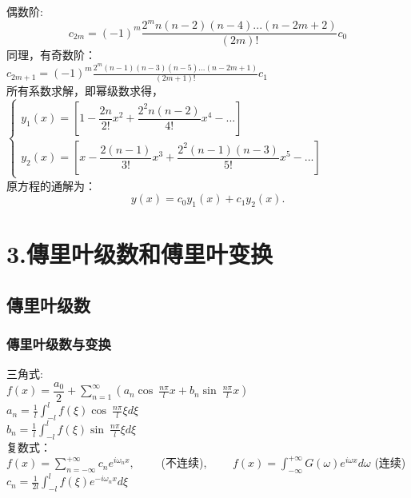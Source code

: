 \begin{frame}	
	偶数阶:
	\[c_{2m} = (-1) ^m \frac{2^mn(n-2)(n-4) ... (n-2m+2)  } {(2m)!} c_0\]
	同理，有奇数阶：\\
	{ $\displaystyle
		c_{2m+1} = (-1) ^m \frac{2^m (n-1) (n-3)(n-5)...(n-2m+1)  } {(2m+1)!} c_1$}\\ \vspace{0.3cm}
	所有系数求解，即幂级数求得，\\
	$\displaystyle \begin{cases}
		y_1(x)  = [1- \dfrac{2n}{2!} x^2+ \dfrac{2^2n(n-2)}{4!} x^4 -...  ] \\
		y_2(x)  = [x- \dfrac{2(n-1)}{3!} x^3+ \dfrac{2^2(n-1)(n-3) }{5!}x^5 -...  ]
	\end{cases}$ \\ \vspace{0.3cm}
	原方程的通解为：
	\begin{equation*}
		y(x) =c_0y_1(x)+c_1 y_2(x).
	\end{equation*}   
\end{frame}

\section{3.傳里叶级数和傅里叶变换}
\subsection{傳里叶级数 }

\begin{frame}
    \frametitle{傳里叶级数与变换}
        三角式: \\ 
        { $\displaystyle f(x) =\dfrac{a_0}{2} +\sum_{n=1}^{\infty}  \left(  a_n \cos~ \frac{n\pi}{l} x +  b_n \sin~ \frac{n\pi}{l} x  \right) $ }\\	
        { $\displaystyle a_n =\frac{1}{l}  \int_{-l}^{l}  f(\xi )   \cos~ \frac{n\pi}{l} \xi d\xi  $ }\\	
        { $\displaystyle b_n =\frac{1}{l}  \int_{-l}^{l}  f(\xi )   \sin~ \frac{n\pi}{l} \xi d\xi   $ }\\	\vspace{0.3em}
        复数式：\\
        {$\displaystyle f(x) =\sum_{n=-\infty}^{+\infty}  c_n e^{i\omega_n x}, \qquad $  (不连续),   $ \qquad f(x) = \int_{-\infty} ^{+\infty} G(\omega) e^{i \omega x} d \omega $ (连续)}\\	
        {$\displaystyle c_n =\frac{1}{2l}  \int_{-l}^{l}  f(\xi)    e^{-i\omega_n x}  d\xi  $ }\\
\end{frame}

